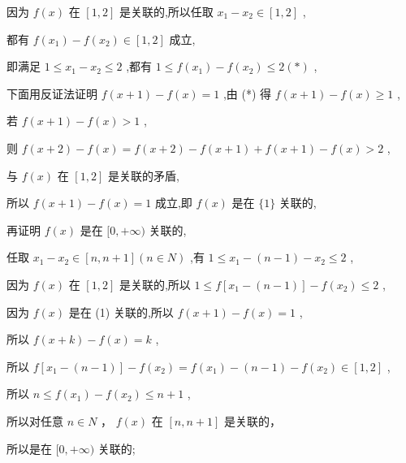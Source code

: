 \documentclass[10pt]{article}
\begin{document}
因为 \(f\left( x\right)\) 在 \(\left\lbrack  {1,2}\right\rbrack\) 是关联的,所以任取 \({x}_{1} - {x}_{2} \in  \left\lbrack  {1,2}\right\rbrack\) ,

都有 \(f\left( {x}_{1}\right)  - f\left( {x}_{2}\right)  \in  \left\lbrack  {1,2}\right\rbrack\) 成立,

即满足 \(1 \leq  {x}_{1} - {x}_{2} \leq  2\) ,都有 \(1 \leq  f\left( {x}_{1}\right)  - f\left( {x}_{2}\right)  \leq  2\left( *\right)\) ,

下面用反证法证明 \(f\left( {x + 1}\right)  - f\left( x\right)  = 1\) ,由 (*) 得 \(f\left( {x + 1}\right)  - f\left( x\right)  \geq  1\) ,

若 \(f\left( {x + 1}\right)  - f\left( x\right)  > 1\) ,

则 \(f\left( {x + 2}\right)  - f\left( x\right)  = f\left( {x + 2}\right)  - f\left( {x + 1}\right)  + f\left( {x + 1}\right)  - f\left( x\right)  > 2\) ,

与 \(f\left( x\right)\) 在 \(\left\lbrack  {1,2}\right\rbrack\) 是关联的矛盾,

所以 \(f\left( {x + 1}\right)  - f\left( x\right)  = 1\) 成立,即 \(f\left( x\right)\) 是在 \(\{ 1\}\) 关联的,

再证明 \(f\left( x\right)\) 是在 \(\lbrack 0, + \infty )\) 关联的,

任取 \({x}_{1} - {x}_{2} \in  \left\lbrack  {n,n + 1}\right\rbrack  \left( {n \in  N}\right)\) ,有 \(1 \leq  {x}_{1} - \left( {n - 1}\right)  - {x}_{2} \leq  2\) ,

因为 \(f\left( x\right)\) 在 \(\left\lbrack  {1,2}\right\rbrack\) 是关联的,所以 \(1 \leq  f\left\lbrack  {{x}_{1} - \left( {n - 1}\right) }\right\rbrack   - f\left( {x}_{2}\right)  \leq  2\) ,

因为 \(f\left( x\right)\) 是在 (1) 关联的,所以 \(f\left( {x + 1}\right)  - f\left( x\right)  = 1\) ,

所以 \(f\left( {x + k}\right)  - f\left( x\right)  = k\) ,

所以 \(f\left\lbrack  {{x}_{1} - \left( {n - 1}\right) }\right\rbrack   - f\left( {x}_{2}\right)  = f\left( {x}_{1}\right)  - \left( {n - 1}\right)  - f\left( {x}_{2}\right)  \in  \left\lbrack  {1,2}\right\rbrack\) ,

所以 \(n \leq  f\left( {x}_{1}\right)  - f\left( {x}_{2}\right)  \leq  n + 1\) ,

所以对任意 \(n \in  N\) ， \(f\left( x\right)\) 在 \(\left\lbrack  {n,n + 1}\right\rbrack\) 是关联的，

所以是在 \(\lbrack 0, + \infty )\) 关联的;
\end{document}
